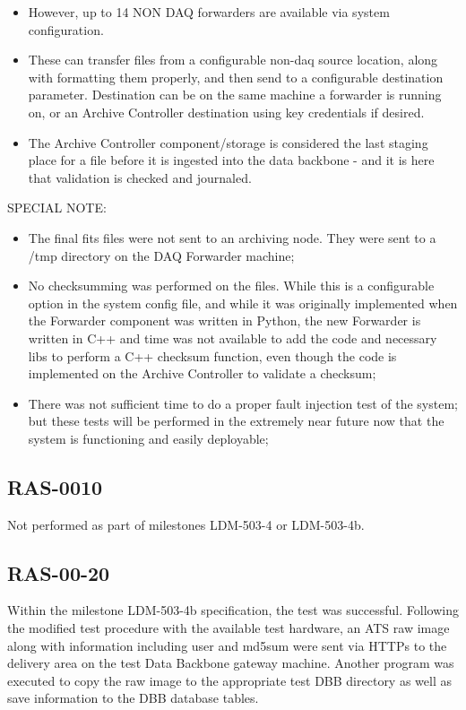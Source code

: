 \documentclass[DM,lsstdraft,STR,toc]{lsstdoc}
\begin{document}
\begin{itemize}
{}
 \item{
However, up to 14 NON DAQ forwarders are available via system configuration.
}
 \item{
These can transfer files from a configurable non-daq source location, along with formatting them properly, and then send to a configurable destination parameter. Destination can be on the same machine a forwarder is running on, or an Archive Controller destination using key credentials if desired.
}
 \item{
The Archive Controller component/storage is considered the last staging place for a file before it is ingested into the data backbone - and it is here that validation is checked and journaled.
}
\end{itemize}

SPECIAL NOTE:
\begin{itemize}

  \item{The final fits files were not sent to an archiving node. They were sent to a /tmp directory on the DAQ Forwarder machine; }
  \item{No checksumming was performed on the files. While this is a configurable option in the system config file, and while it was originally implemented when the Forwarder component was written in Python, the new Forwarder is written in C++ and time was not available to add the code and necessary libs to perform a C++ checksum function, even though the code is implemented on the Archive Controller to validate a checksum; }
  \item{ There was not sufficient time to do a proper fault injection test of the system; but these tests will be performed in the extremely near future now that the system is functioning and easily deployable;}
\end{itemize}

\subsection{RAS-0010}
\label{sect:detail-RAS-00-10}
Not performed as part of milestones LDM-503-4 or LDM-503-4b.
\subsection{RAS-00-20}
\label{sect:detail-RAS-00-20}

Within the milestone LDM-503-4b specification, the test was successful.
Following the modified test procedure with the available test
hardware, an ATS raw image along with information including user
and md5sum were sent via HTTPs to the delivery area on the test
Data Backbone gateway machine.   Another program was executed to
copy the raw image to the appropriate test DBB directory as well as
save information to the DBB database tables.
\end{document}
